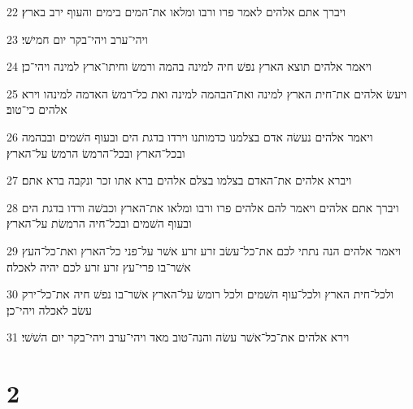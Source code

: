 \par 22 ויברך אתם אלהים לאמר פרו ורבו ומלאו את־המים בימים והעוף ירב בארץ׃
\par 23 ויהי־ערב ויהי־בקר יום חמישׁי׃
\par 24 ויאמר אלהים תוצא הארץ נפשׁ חיה למינה בהמה ורמשׂ וחיתו־ארץ למינה ויהי־כן׃
\par 25 ויעשׂ אלהים את־חית הארץ למינה ואת־הבהמה למינה ואת כל־רמשׂ האדמה למינהו וירא אלהים כי־טוב׃
\par 26 ויאמר אלהים נעשׂה אדם בצלמנו כדמותנו וירדו בדגת הים ובעוף השׁמים ובבהמה ובכל־הארץ ובכל־הרמשׂ הרמשׂ על־הארץ׃
\par 27 ויברא אלהים את־האדם בצלמו בצלם אלהים ברא אתו זכר ונקבה ברא אתם׃
\par 28 ויברך אתם אלהים ויאמר להם אלהים פרו ורבו ומלאו את־הארץ וכבשׁה ורדו בדגת הים ובעוף השׁמים ובכל־חיה הרמשׂת על־הארץ׃
\par 29 ויאמר אלהים הנה נתתי לכם את־כל־עשׂב זרע זרע אשׁר על־פני כל־הארץ ואת־כל־העץ אשׁר־בו פרי־עץ זרע זרע לכם יהיה לאכלה׃
\par 30 ולכל־חית הארץ ולכל־עוף השׁמים ולכל רומשׂ על־הארץ אשׁר־בו נפשׁ חיה את־כל־ירק עשׂב לאכלה ויהי־כן׃
\par 31 וירא אלהים את־כל־אשׁר עשׂה והנה־טוב מאד ויהי־ערב ויהי־בקר יום השׁשׁי׃

\chapter{2}


